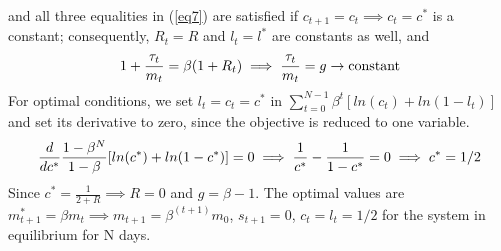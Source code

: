 and all three equalities in (\ref{eq7}) are satisfied if $c_{t+1}=c_t \implies c_t =c^*$ is a constant; consequently, $R_t=R$ and $l_t = l^*$ are constants as well, and 
\begin{align}{\label{eq9}}
	1+\frac{\tau_t}{m_t} = \beta(1+R_t) \implies \frac{\tau_t}{m_t}=g \rightarrow \textrm{constant}
\end{align}
For optimal conditions, we set $l_t = c_t = c^*$ in $\sum_{t=0}^{N-1}{\beta^t}[ln(c_t)+ln(1-l_t)]$ and set its derivative to zero, since the objective is reduced to one variable.
\begin{align}{\label{eq10}}
	\frac{d}{dc^*}\frac{1-\beta^N}{1-\beta}[ln(c^*)+ln(1-c^*)]=0 \implies \frac{1}{c^*}-\frac{1}{1-c^*}=0 \implies c^* = 1/2
\end{align}
Since $c^*=\frac{1}{2+R} \implies R = 0$ and $g=\beta-1$. The optimal values are $m_{t+1}^*=\beta m_t \implies m_{t+1} = \beta^(t+1) m_0$, $s_{t+1}=0$, $c_{t} = l_{t} = 1/2$ for the system in equilibrium for N days.